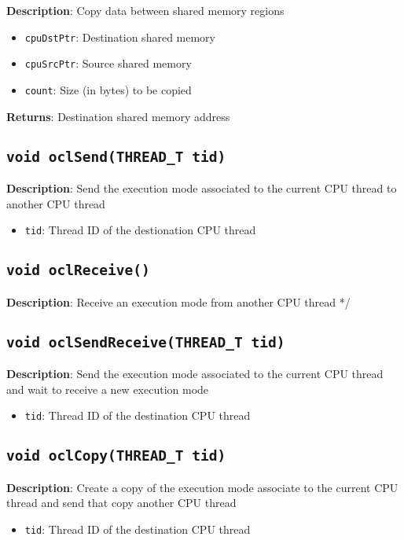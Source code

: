 \textbf{Description}: Copy data between shared memory regions
\begin{itemize}
  \item \texttt{cpuDstPtr}: Destination shared memory
  \item \texttt{cpuSrcPtr}: Source shared memory
  \item \texttt{count}: Size (in bytes) to be copied
\end{itemize}
\textbf{Returns}: Destination shared memory address

\subsection{\texttt{void oclSend(THREAD\_T tid)}}

\textbf{Description}: Send the execution mode associated to the current CPU thread to another CPU thread
\begin{itemize}
  \item \texttt{tid}: Thread ID of the destionation CPU thread
\end{itemize}

\subsection{\texttt{void oclReceive()}}

\textbf{Description}: Receive an execution mode from another CPU thread */

\subsection{\texttt{void oclSendReceive(THREAD\_T tid)}}

\textbf{Description}: Send the execution mode associated to the current CPU thread and wait to receive a new execution mode
\begin{itemize}
  \item \texttt{tid}: Thread ID of the destination CPU thread
\end{itemize}

\subsection{\texttt{void oclCopy(THREAD\_T tid)}}

\textbf{Description}: Create a copy of the execution mode associate to the current CPU thread and send that copy another CPU thread
\begin{itemize}
  \item \texttt{tid}: Thread ID of the destination CPU thread
\end{itemize}

